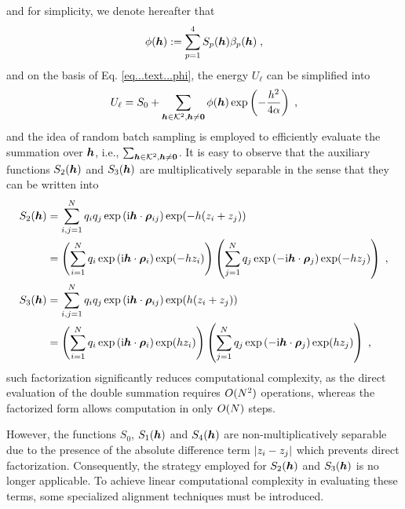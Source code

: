 and for simplicity, we denote hereafter that 
\begin{equation}\label{eq...text...phi}
    \phi(\boldsymbol{h}):=\sum_{p=1}^4S_p(\boldsymbol{h}) \beta_p(\boldsymbol{h})\;,
\end{equation}
and on the basis of Eq. \eqref{eq...text...phi}, the   energy   $U_\ell$ can be simplified into 
\begin{equation} \label{eq...text...EnergywithPhi}
U_\ell =    S_0+ \sum_{\boldsymbol{h}\in\mathcal{K}^2,\boldsymbol{h}\neq\bm{0}} \phi(\boldsymbol{h})\exp\left(-\frac{h^2}{4\alpha}\right) \;,
\end{equation}
and the idea of random batch sampling is employed to efficiently evaluate the summation over   $\boldsymbol{h}$, i.e., $\sum_{\boldsymbol{h}\in\mathcal{K}^2,\boldsymbol{h}\neq\bm{0}}$. 
It is easy to observe that  the  auxiliary functions  $S_2(\boldsymbol{h})$ and $S_3(\boldsymbol{h})$ are multiplicatively separable  in the sense that  they can be written into
\begin{align*}
S_2(\boldsymbol{h})&=\sum_{i,j=1}^Nq_iq_j  \exp{(\mathrm{i} \boldsymbol{h} \cdot \boldsymbol{\rho}_{ij})}\exp(-h(z_i+z_j))\\
&=\left(\sum_{i=1}^Nq_i\exp{(\mathrm{i} \boldsymbol{h} \cdot \boldsymbol{\rho}_{i})}\exp(-hz_i)\right)\left(\sum_{j=1}^Nq_j\exp{(-\mathrm{i} \boldsymbol{h} \cdot \boldsymbol{\rho}_{j})}\exp(-hz_j)\right)\;,\\
S_3(\boldsymbol{h})&=\sum_{i,j=1}^Nq_iq_j  \exp{(\mathrm{i} \boldsymbol{h} \cdot \boldsymbol{\rho}_{ij})}\exp(h(z_i+z_j))\\
&=\left(\sum_{i=1}^Nq_i  \exp{(\mathrm{i} \boldsymbol{h} \cdot \boldsymbol{\rho}_{i})}\exp(hz_i)\right)\left(\sum_{j=1}^Nq_j  \exp{(-\mathrm{i} \boldsymbol{h} \cdot \boldsymbol{\rho}_{j})}\exp(hz_j)\right)\;,
\end{align*}
such factorization significantly reduces computational complexity, as the direct evaluation of the double summation requires 
$O(N^2)$ operations, whereas the factorized form allows computation in only 
$O(N)$ steps.

However, the functions $S_0$,  $S_1(\boldsymbol{h})$ and $S_4(\boldsymbol{h})$  are non-multiplicatively separable due to the presence of the absolute difference term $\lvert z_i - z_j\rvert$ which prevents direct factorization. Consequently, the strategy employed for 
$S_2(\boldsymbol{h})$ and $S_3(\boldsymbol{h})$ is no longer applicable. To achieve linear computational complexity in evaluating these terms,  some specialized alignment techniques must be introduced.

